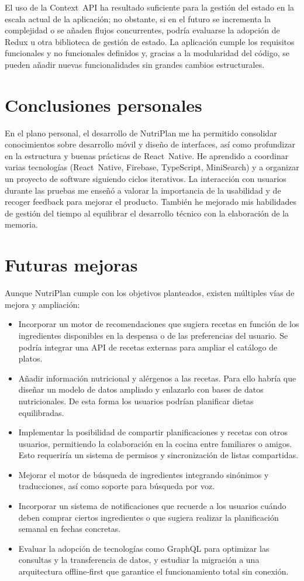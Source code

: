 \documentclass[twoside, openright, 11pt]{report}
\begin{document}
El uso de la Context API ha resultado suficiente para la gestión del estado en la escala actual de la aplicación; no obstante, si en el futuro se incrementa la complejidad o se añaden flujos concurrentes, podría evaluarse la adopción de Redux u otra biblioteca de gestión de estado. La aplicación cumple los requisitos funcionales y no funcionales definidos y, gracias a la modularidad del código, se pueden añadir nuevas funcionalidades sin grandes cambios estructurales.

\section{Conclusiones personales}
En el plano personal, el desarrollo de NutriPlan me ha permitido consolidar conocimientos sobre desarrollo móvil y diseño de interfaces, así como profundizar en la estructura y buenas prácticas de React Native. He aprendido a coordinar varias tecnologías (React Native, Firebase, TypeScript, MiniSearch) y a organizar un proyecto de software siguiendo ciclos iterativos. La interacción con usuarios durante las pruebas me enseñó a valorar la importancia de la usabilidad y de recoger feedback para mejorar el producto. También he mejorado mis habilidades de gestión del tiempo al equilibrar el desarrollo técnico con la elaboración de la memoria.

\section{Futuras mejoras}
Aunque NutriPlan cumple con los objetivos planteados, existen múltiples vías de mejora y ampliación:

\begin{itemize}
  \item Incorporar un motor de recomendaciones que sugiera recetas en función de los ingredientes disponibles en la despensa o de las preferencias del usuario. Se podría integrar una API de recetas externas para ampliar el catálogo de platos.
  \item Añadir información nutricional y alérgenos a las recetas. Para ello habría que diseñar un modelo de datos ampliado y enlazarlo con bases de datos nutricionales. De esta forma los usuarios podrían planificar dietas equilibradas.
  \item Implementar la posibilidad de compartir planificaciones y recetas con otros usuarios, permitiendo la colaboración en la cocina entre familiares o amigos. Esto requeriría un sistema de permisos y sincronización de listas compartidas.
  \item Mejorar el motor de búsqueda de ingredientes integrando sinónimos y traducciones, así como soporte para búsqueda por voz.
  \item Incorporar un sistema de notificaciones que recuerde a los usuarios cuándo deben comprar ciertos ingredientes o que sugiera realizar la planificación semanal en fechas concretas.
  \item Evaluar la adopción de tecnologías como GraphQL para optimizar las consultas y la transferencia de datos, y estudiar la migración a una arquitectura offline‑first que garantice el funcionamiento total sin conexión.
\end{itemize}
\end{document}
